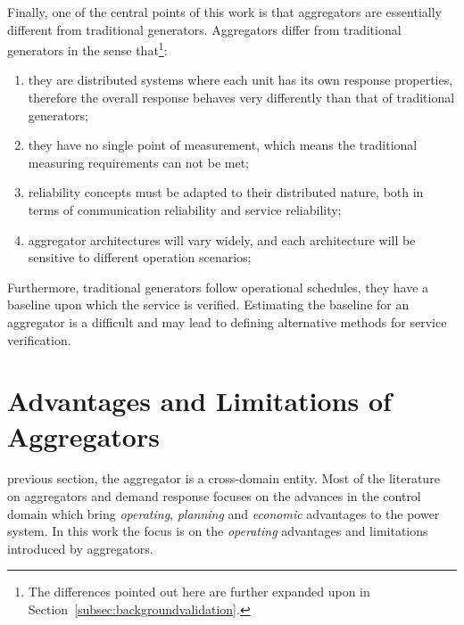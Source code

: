 Finally, one of the central points of this work is that aggregators are essentially different from traditional generators. Aggregators differ from traditional generators in the sense that\footnote{The differences pointed out here are further expanded upon in Section~\ref{subsec:backgroundvalidation}.}:
\begin{enumerate}
	\item they are distributed systems where each unit has its own response properties, therefore the overall response behaves very differently than that of traditional generators;\label{point:aggblackbox}
	\item they have no single point of measurement, which means the traditional measuring requirements can not be met;
	\item reliability concepts must be adapted to their distributed nature, both in terms of communication reliability and service reliability;
	\item aggregator architectures will vary widely, and each architecture will be sensitive to different operation scenarios;
\end{enumerate}

Furthermore, traditional generators follow operational schedules, \ie they have a baseline upon which the service is verified. Estimating the baseline for an aggregator is a difficult and may lead to defining alternative methods for service verification.
\section{Advantages and Limitations of Aggregators}\label{sec:aggadvantlim}
 previous section, the aggregator is a cross-domain entity. Most of the literature on aggregators and demand response focuses on the advances in the control domain which bring \emph{operating}, \emph{planning} and \emph{economic} advantages to the power system. In this work the focus is on the \emph{operating} advantages and limitations introduced by aggregators. 
